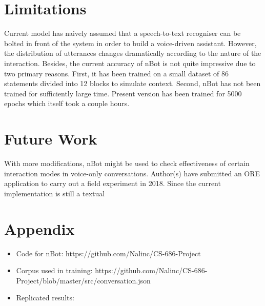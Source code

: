 \documentclass[letterpaper] {article} %
\begin{document}
\section{Limitations}
Current model has naively assumed that a speech-to-text recogniser can be bolted in front of the system in order to build a voice-driven assistant. However, the distribution of utterances changes dramatically according to the nature of the interaction. Besides, the current accuracy of nBot is not quite impressive due to two primary reasons. First, it has been trained on a small dataset of 86 statements divided into 12 blocks to simulate context. Second, nBot has not been trained for sufficiently large time. Present version has been trained for 5000 epochs which itself took a couple hours. 

\section{Future Work}
With more modifications, nBot might be used to check effectiveness of certain interaction modes in voice-only conversations. Author(s) have submitted an ORE application to carry out a field experiment in 2018. Since the current implementation is still a textual 




\section{Appendix}
\begin{itemize}
	\item Code for nBot: https://github.com/Nalinc/CS-686-Project
	\item Corpus used in training: https://github.com/Nalinc/CS-686-Project/blob/master/src/conversation.json
	\item Replicated results:
\end{itemize}
\end{document}
